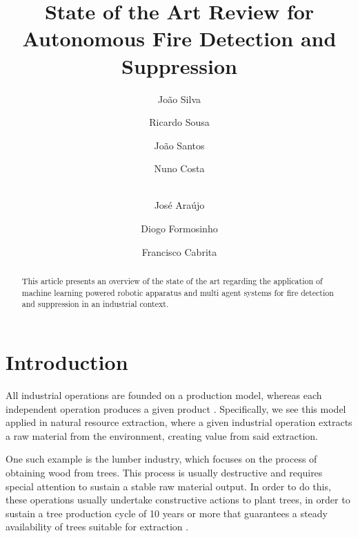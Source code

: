 \documentclass[runningheads]{llncs}
\begin{document}
\title{State of the Art Review for Autonomous Fire Detection and Suppression}

\author{João Silva \and Ricardo Sousa \and
João Santos \and Nuno Costa \and\\ José Araújo \and Diogo Formosinho \and Francisco Cabrita}


\maketitle

\begin{abstract}

This article presents an overview of the state of the art regarding the application of machine learning powered robotic apparatus and multi agent systems for fire detection and suppression in an industrial context.



\end{abstract}

\section{Introduction}
\label{sec:int}

All industrial operations are founded on a production model, whereas each independent operation produces a given product \cite{industrymwd}. Specifically, we see this model applied in natural resource extraction, where a given industrial operation extracts a raw material from the environment, creating value from said extraction.


One such example is the lumber industry, which focuses on the process of obtaining wood from trees. This process is usually destructive and requires special attention to sustain a stable raw material output. In order to do this, these operations usually undertake constructive actions to plant trees, in order to sustain a tree production cycle of 10 years or more that guarantees a steady availability of trees suitable for extraction \cite{lumber}.
\end{document}
